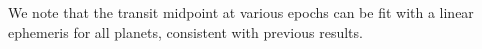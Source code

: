 We note that the transit midpoint at various epochs can be fit with a linear ephemeris for all planets, consistent with previous results.

